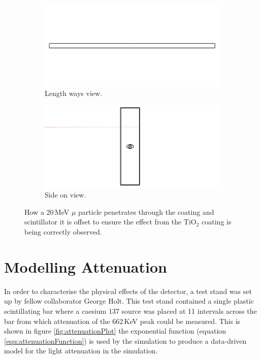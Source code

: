 \begin{figure}[!h]
\centering
\begin{subfigure}{.5\textwidth}
  \centering
  \includegraphics[width=\linewidth]{Chapter4/Figs/Raster/lengthOnViewBarMuon1530By720.png}
  \captionsetup{width=.9\linewidth}
  \caption{Length ways view.}
  \label{subFig:lengthOnViewBarMuon1530Square}
\end{subfigure}%
\begin{subfigure}{.5\textwidth}
  \centering
  \includegraphics[width=\linewidth]{Chapter4/Figs/Raster/sideOnViewBarMuon1530By720.png}
  \captionsetup{width=.9\linewidth}
  \caption{Side on view.}
  \label{subFig:sideOnViewBarMuon8}
\end{subfigure}
\caption{How a 20\,MeV $\mu$ particle penetrates through the coating and scintillator it is offset to ensure the effect from the TiO$_2$ coating is being correctly observed.}
\label{fig:lengthAndSideViewBarMuon}
\end{figure}

\section{Modelling Attenuation}\label{sec:GEANT4Simulation_ModellingAttenuation}
In order to characterise the physical effects of the detector, a test stand was set up by fellow collaborator George Holt. This test stand contained a single plastic scintillating bar where a caesium 137 source was placed at 11 intervals across the bar from which attenuation of the 662\,KeV peak could be measured. This is shown in figure \ref{fig:attenuationPlot} the exponential function (equation \ref{equ:attenuationFunction}) is used by the simulation to produce a data-driven model for the light attenuation in the simulation. 

